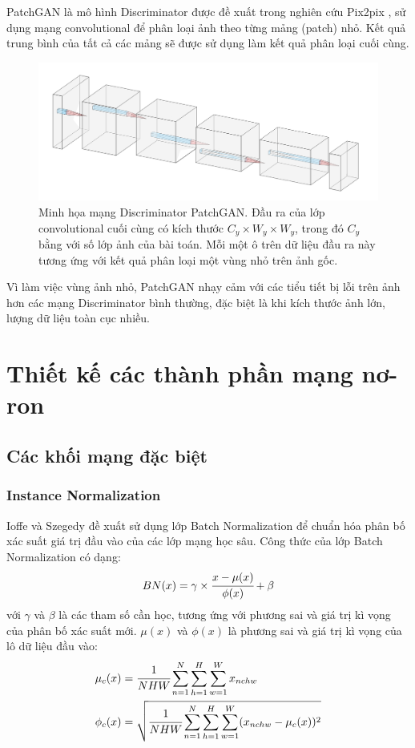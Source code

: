 \documentclass[12pt]{extreport}
\begin{document}
PatchGAN là mô hình Discriminator được đề xuất trong nghiên cứu Pix2pix \cite{pix2pix2017}, sử dụng mạng convolutional để phân loại ảnh theo từng mảng (patch) nhỏ. Kết quả trung bình của tất cả các mảng sẽ được sử dụng làm kết quả phân loại cuối cùng.

\begin{figure}[H]
    \centering
    \includegraphics[width=\linewidth]{figure37.png}
    \caption{Minh họa mạng Discriminator PatchGAN. Đầu ra của lớp convolutional cuối cùng có kích thước $ C_y \times W_y \times W_y $, trong đó $ C_y $ bằng với số lớp ảnh của bài toán. Mỗi một ô trên dữ liệu đầu ra này tương ứng với kết quả phân loại một vùng nhỏ trên ảnh gốc.}
\end{figure}

Vì làm việc vùng ảnh nhỏ, PatchGAN nhạy cảm với các tiểu tiết bị lỗi trên ảnh hơn các mạng Discriminator bình thường, đặc biệt là khi kích thước ảnh lớn, lượng dữ liệu toàn cục nhiều.

\section{Thiết kế các thành phần mạng nơ-ron}

\subsection{Các khối mạng đặc biệt}

\subsubsection{Instance Normalization}

Ioffe và Szegedy đề xuất sử dụng lớp Batch Normalization \cite{DBLP:journals/corr/IoffeS15} để chuẩn hóa phân bố xác suất giá trị đầu vào của các lớp mạng học sâu. Công thức của lớp Batch Normalization có dạng:
$$ BN(x) = \gamma \times \cfrac{x - \mu(x)}{\phi(x)} + \beta $$
với $ \gamma $ và $ \beta $ là các tham số cần học, tương ứng với phương sai và giá trị kì vọng của phân bố xác suất mới. $ \mu(x) $ và $ \phi(x) $ là phương sai và giá trị kì vọng của lô dữ liệu đầu vào:
\begin{align*}
    \mu_c(x)  & = \cfrac{1}{NHW} \sum_{n = 1}^{N} \sum_{h = 1}^{H} \sum_{w = 1}^{W} x_{nchw}                       \\
    \phi_c(x) & = \sqrt{\cfrac{1}{NHW} \sum_{n = 1}^{N} \sum_{h = 1}^{H} \sum_{w = 1}^{W} (x_{nchw} - \mu_c(x))^2}
\end{align*}
\end{document}
